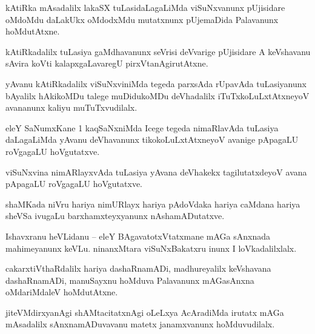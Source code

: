 \documentclass{article}
\begin{document}
\begin{mn}%
kAtiRka mAsadalilx lakaSX tuLasidaLagaLiMda viSuNxvanunx pUjisidare oMdoMdu daLakUkx oMdodxMdu 
mutatxnunx pUjemaDida Palavanunx hoMdutAtxne.
\end{mn}

\begin{mn}%
kAtiRkadalilx tuLasiya gaMdhavanunx seVrisi deVvarige pUjisidare A keVshavanu sAvira koVti 
kalapxgaLavaregU pirxVtanAgirutAtxne.
\end{mn}

\begin{mn}%
yAvanu kAtiRkadalilx viSuNxviniMda tegeda parxsAda rUpavAda tuLasiyanunx bAyalilx hAkikoMDu talege 
muDidukoMDu deVhadalilx iTuTxkoLuLxtAtxneyoV avananunx kaliyu muTuTxvudilalx.
\end{mn}

\begin{mn}%
eleY SaNumxKane 1 kaqSaNxniMda Icege tegeda nimaRlavAda tuLasiya daLagaLiMda yAvanu deVhavanunx 
tikokoLuLxtAtxneyoV avanige pApagaLU roVgagaLU hoVgutatxve.
\end{mn}

\begin{mn}%
viSuNxvina nimARlayxvAda tuLasiya yAvana deVhakekx tagilutatxdeyoV avana pApagaLU roVgagaLU 
hoVgutatxve.
\end{mn}

\begin{mn}%
shaMKada niVru hariya nimURlayx hariya pAdoVdaka hariya caMdana hariya sheVSa ivugaLu 
barxhamxteyxyanunx nAshamADutatxve.
\end{mn}


\begin{mn}%
Ishavxranu heVLidanu -- eleY BAgavatotxVtatxmane mAGa sAnxnada mahimeyanunx keVLu. ninanxMtara 
viSuNxBakatxru inunx I loVkadalilxlalx. 
\end{mn}

\begin{mn}%
cakarxtiVthaRdalilx hariya dashaRnamADi, madhureyalilx keVshavana dashaRnamADi, manuSayxnu hoMduva 
Palavanunx mAGasAnxna oMdariMdaleV hoMdutAtxne.
\end{mn}

\begin{mn}%
jiteVMdirxyanAgi shAMtacitatxnAgi oLeLxya AcAradiMda irutatx mAGa mAsadalilx sAnxnamADuvavanu 
matetx janamxvanunx hoMduvudilalx.
\end{mn}
\end{document}
